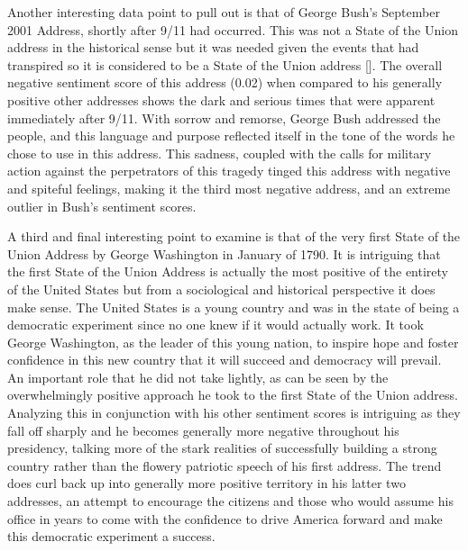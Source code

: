 Another interesting data point to pull out is that of George Bush's September 2001 Address, shortly after 9/11 had occurred.
This was not a State of the Union address in the historical sense but it was needed given the events that had transpired so it is considered to be a State of the Union address [\cite{bush2001911}].
The overall negative sentiment score of this address (0.02) when compared to his generally positive other addresses shows the dark and serious times that were apparent immediately after 9/11.
With sorrow and remorse, George Bush addressed the people, and this language and purpose reflected itself in the tone of the words he chose to use in this address.
This sadness, coupled with the calls for military action against the perpetrators of this tragedy tinged this address with negative and spiteful feelings, making it the third most negative address, and an extreme outlier in Bush's sentiment scores.

A third and final interesting point to examine is that of the very first State of the Union Address by George Washington in January of 1790.
It is intriguing that the first State of the Union Address is actually the most positive of the entirety of the United States but from a sociological and historical perspective it does make sense.
The United States is a young country and was in the state of being a democratic experiment since no one knew if it would actually work.
It took George Washington, as the leader of this young nation, to inspire hope and foster confidence in this new country that it will succeed and democracy will prevail.
An important role that he did not take lightly, as can be seen by the overwhelmingly positive approach he took to the first State of the Union address.
Analyzing this in conjunction with his other sentiment scores is intriguing as they fall off sharply and he becomes generally more negative throughout his presidency, talking more of the stark realities of successfully building a strong country rather than the flowery patriotic speech of his first address.
The trend does curl back up into generally more positive territory in his latter two addresses, an attempt to encourage the citizens and those who would assume his office in years to come with the confidence to drive America forward and make this democratic experiment a success.